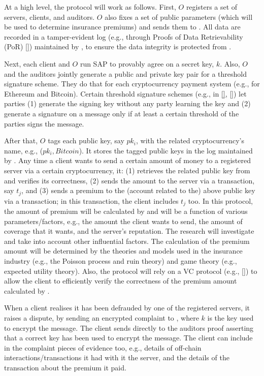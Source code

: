 At a high level, the protocol will work as follows. First, $O$ registers a set of servers,  clients, and auditors. $O$ also fixes a set of public parameters (which will be used to determine insurance premiums) and sends them to \cs. All data are recorded in a tamper-evident log (e.g., through Proofs of Data Retrievability (PoR) [\printcntr]) maintained by \cs, to ensure the data integrity is protected from \cs. 

Next, each client and $O$ run SAP to provably agree on a secret key, $k$. Also, $O$ and the auditors jointly generate a public and private key pair for a threshold signature scheme. They do that for each cryptocurrency payment system (e.g., for Ethereum and Bitcoin). Certain threshold signature schemes (e.g.,  in \href{https://link.springer.com/chapter/10.1007/3-540-44987-6_10}{[\printcntr]}, \href{https://link.springer.com/chapter/10.1007/978-3-319-39555-5_9}{[\printcntr]}) let parties (1) generate the signing key without any party learning the key and (2) generate a signature on a message only if at least a certain threshold of the parties signs the message. 

After that, $O$ tags each public key, say $pk_i$, with the related cryptocurrency's name, e.g., ($pk_{i}, Bitcoin$). It stores the tagged public keys in the log maintained by \cs. 
% 
 Any time a client wants to send a certain amount of money to a registered server via a certain cryptocurrency, it: (1) retrieves the related public key from \cs and verifies its correctness, (2) sends the amount to the server via a transaction, say $t_j$, and (3) sends a premium to the (account related to the) above public key via a transaction; in this transaction, the client includes $t_j$ too. In this protocol, the amount of premium will be calculated by \cs and will be a function of various parameters/factors, e.g.,  the amount the client wants to send, the amount of coverage that it wants, and the server's reputation. The research will investigate and take into account other influential factors. The calculation of the premium amount will be determined by the theories and models used in the insurance industry (e.g., the Poisson process and ruin theory) and game theory (e.g., expected utility theory).  Also, the protocol will rely on a VC protocol (e.g., \href{https://link.springer.com/chapter/10.1007/978-3-642-14623-7_25}{[\printcntr]}) to allow the client to efficiently verify the correctness of the premium amount calculated by \cs. 

When a client realises it has been defrauded by one of the registered servers, it raises a dispute, by sending an encrypted complaint to \cs, where $k$ is the key used to encrypt the message. The client sends directly to the auditors proof asserting that a correct key has been used to encrypt the message. The client can include in the complaint pieces of evidence too, e.g., details of off-chain interactions/transactions it had with it the server, and the details of the transaction about the premium it paid. 


